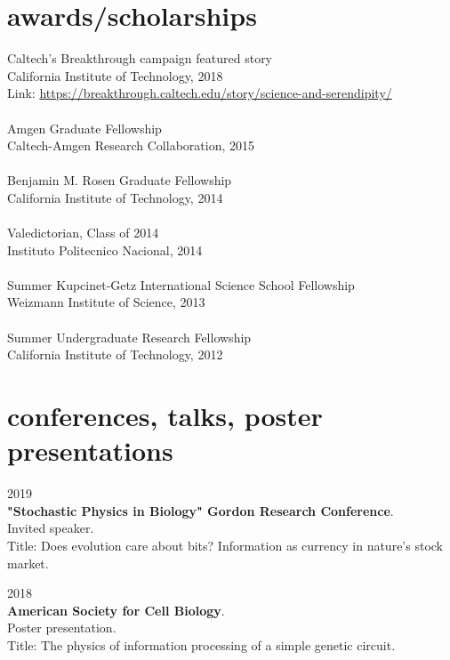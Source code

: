 \documentclass[]{friggeri-cv}
\begin{document}
\section{awards/scholarships}

Caltech's Breakthrough campaign featured story\\
{California Institute of Technology, 2018}\\
Link: \url{https://breakthrough.caltech.edu/story/science-and-serendipity/}\\
\\
Amgen Graduate Fellowship\\
{Caltech-Amgen Research Collaboration, 2015}\\
\\
Benjamin M. Rosen Graduate Fellowship\\
{California Institute of Technology, 2014}\\
\\
Valedictorian, Class of 2014\\
{Instituto Politecnico Nacional, 2014}\\
\\
Summer Kupcinet-Getz International Science School Fellowship\\
{Weizmann Institute of Science, 2013}\\
\\
Summer Undergraduate Research Fellowship\\
{California Institute of Technology, 2012}\\

\pagebreak

\section{conferences, talks, poster presentations}

{\small{} 2019}\\
\textbf{"Stochastic Physics in Biology" Gordon Research Conference}.\\
{Invited speaker.}\\
Title: Does evolution care about bits? Information as currency in nature's stock market.

{\small{} 2018}\\
\textbf{American Society for Cell Biology}.\\
{Poster presentation.}\\
Title: The physics of information processing of a simple genetic circuit.
\end{document}
